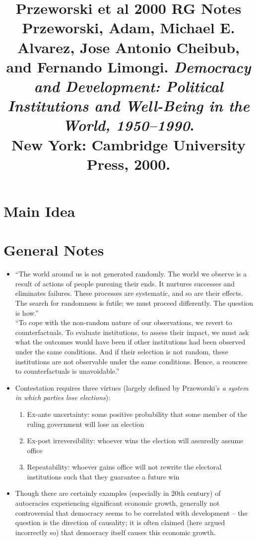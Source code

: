 \documentclass[12pt]{article}
\title{\textbf{Przeworski et al 2000 RG Notes}\\
\large Przeworski, Adam, Michael E. Alvarez, Jose Antonio Cheibub, and Fernando Limongi. \textit{Democracy and Development: Political Institutions and Well-Being in the World, 1950--1990}.\\
New York: Cambridge University Press, 2000.}
\author{}
\date{}
\begin{document}
\maketitle

\section{Main Idea}



\section{General Notes}

\begin{itemize}[leftmargin=*, itemsep=4pt]
    \item ``The world around us is not generated randomly. The world we observe is a result of actions of people pursuing their ends. It nurtures successes and eliminates failures. These processes are systematic, and so are their effects. The search for randomness is futile; we must proceed differently. The question is how.'' \\
    ``To cope with the non-random nature of our observations, we revert to counterfactuals. To evaluate institutions, to assess their impact, we must ask what the outcomes would have been if other institutions had been observed under the same conditions. And if their selection is not random, these institutions are not observable under the same conditions. Hence, a reoucrse to counterfactuals is unavoidable.''
    \item Contestation requires three virtues (largely defined by Przeworski's \emph{a system in which parties lose elections}):
    \begin{enumerate}
        \item Ex-ante uncertainty: some positive probability that some member of the ruling government will lose an election
        \item Ex-post irreversibility: whoever wins the election will assuredly assume office
        \item Repeatability: whoever gains office will not rewrite the electoral institutions such that they guarantee a future win
    \end{enumerate}
    \item Though there are certainly examples (especially in 20th century) of autocracies experiencing significant economic growth, generally not controversial that democracy seems to be correlated with development -- the question is the direction of causality; it is often claimed (here argued incorrectly so) that democracy itself causes this economic growth.

\end{itemize}
\end{document}
